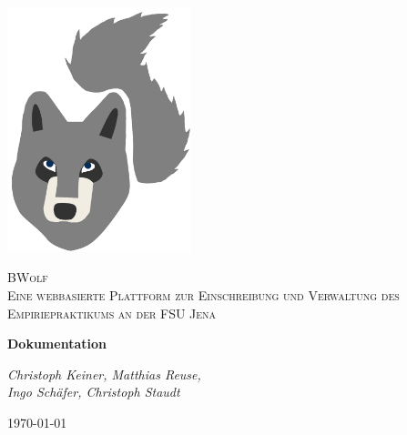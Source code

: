 \documentclass[12pt,a4paper]{report}
\begin{document}
    
    \begin{titlepage}
        \centering
        \includegraphics[width=0.4\textwidth]{./LogoSoFar.png}\par\vspace{1cm}
        {\scshape \LARGE BWolf \\ \Large Eine webbasierte Plattform zur
            Einschreibung und Verwaltung des
            Empiriepraktikums an der FSU Jena\par}
        \vspace{1.5cm}
        {\huge\bfseries Dokumentation\par}
        \vspace{1.5cm}
        {\large\itshape Christoph Keiner, Matthias Reuse,\\ Ingo Schäfer, Christoph Staudt\par}
        \vspace{1.0cm}
        {\large \today\par}
    \end{titlepage}
    \onehalfspacing

\end{document}
